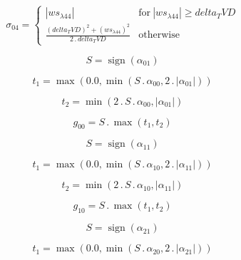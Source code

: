 \documentclass{article}
\begin{document}
\begin{dmath}\sigma_{0 4} = \begin{cases} \left|{ws_{\lambda 44}}\right| & \text{for}\: \left|{ws_{\lambda 44}}\right| \geq delta_TVD \\\frac{\left(delta_TVD \right)^{2} + \left(ws_{\lambda 44} \right)^{2}}{2 \,.\, delta_TVD} & \text{otherwise} 
\end{cases}\end{dmath}

\begin{dmath}S = \operatorname{sign}{\left (\alpha_{01} \right )}\end{dmath}

\begin{dmath}t_{1} = \max\left(0.0, \min\left(S \,.\, \alpha_{00}, 2 \,.\, \left|{\alpha_{01}}\right|\right)\right)\end{dmath}

\begin{dmath}t_{2} = \min\left(2 \,.\, S \,.\, \alpha_{00}, \left|{\alpha_{01}}\right|\right)\end{dmath}

\begin{dmath}g_{00} = S \,.\, \max\left(t_{1}, t_{2}\right)\end{dmath}

\begin{dmath}S = \operatorname{sign}{\left (\alpha_{11} \right )}\end{dmath}

\begin{dmath}t_{1} = \max\left(0.0, \min\left(S \,.\, \alpha_{10}, 2 \,.\, \left|{\alpha_{11}}\right|\right)\right)\end{dmath}

\begin{dmath}t_{2} = \min\left(2 \,.\, S \,.\, \alpha_{10}, \left|{\alpha_{11}}\right|\right)\end{dmath}

\begin{dmath}g_{10} = S \,.\, \max\left(t_{1}, t_{2}\right)\end{dmath}

\begin{dmath}S = \operatorname{sign}{\left (\alpha_{21} \right )}\end{dmath}

\begin{dmath}t_{1} = \max\left(0.0, \min\left(S \,.\, \alpha_{20}, 2 \,.\, \left|{\alpha_{21}}\right|\right)\right)\end{dmath}
\end{document}
